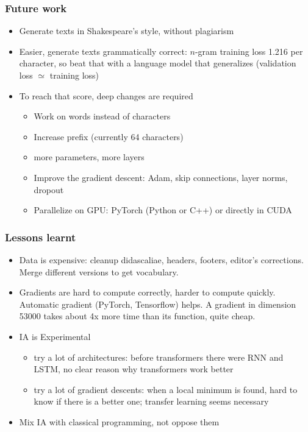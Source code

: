 \documentclass{beamer}
\begin{document}
\begin{frame}
\frametitle{Future work}

\begin{itemize}
\item Generate texts in Shakespeare's style, without plagiarism
\bigskip
\item Easier, generate texts grammatically correct: $n$-gram training loss 1.216 per character, so beat that with a language model that generalizes (validation loss $\simeq$ training loss)
\bigskip
\item To reach that score, deep changes are required
\begin{itemize}
\item Work on words instead of characters
\item Increase prefix (currently 64 characters)
\item more parameters, more layers
\item Improve the gradient descent: Adam, skip connections, layer norms, dropout
\item Parallelize on GPU: PyTorch (Python or C++) or directly in CUDA
\end{itemize}
\end{itemize}
\end{frame}

\begin{frame}
\frametitle{Lessons learnt}

\begin{itemize}
\item Data is expensive: cleanup didascaliae, headers, footers, editor's corrections. Merge different versions to get vocabulary.
\bigskip
\item Gradients are hard to compute correctly, harder to compute quickly. Automatic gradient (PyTorch, Tensorflow) helps. A gradient in dimension 53000 takes about 4x more time than its function, quite cheap.
\bigskip
\item IA is Experimental
\begin{itemize}
\item try a lot of architectures: before transformers there were RNN and LSTM, no clear reason why transformers work better
\item try a lot of gradient descents: when a local minimum is found, hard to know if there is a better one; transfer learning seems necessary
\end{itemize}
\bigskip
\item Mix IA with classical programming, not oppose them
\end{itemize}
\end{frame}
\end{document}
